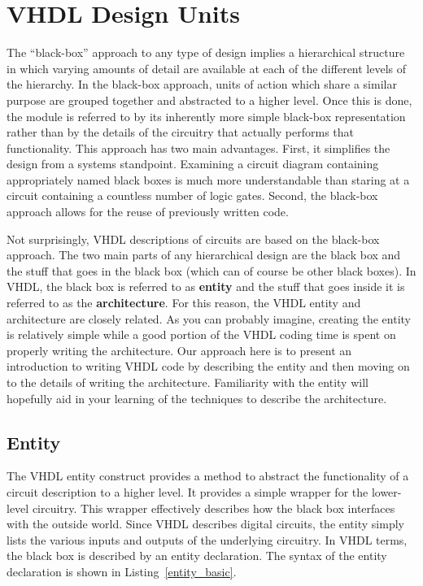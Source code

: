 %
%
\chapter{VHDL Design Units}
The ``black-box'' approach to any type of design implies a hierarchical structure in which varying amounts of detail are available at each of the different levels of the hierarchy. In the black-box approach, units of action which share a similar purpose are grouped together and abstracted to a higher level. Once this is done, the module is referred to by its inherently more simple black-box representation rather than by the details of the circuitry that actually performs that functionality. This approach has two main advantages. First, it simplifies the design from a systems standpoint. Examining a circuit diagram containing appropriately named black boxes is much more understandable than staring at a circuit containing a countless number of logic gates. Second, the black-box approach allows for the reuse of previously written code.

Not surprisingly, VHDL descriptions of circuits are based on the black-box approach. The two main parts of any hierarchical design are the black box and the stuff that goes in the black box (which can of course be other black boxes). In VHDL, the black box is referred to as \textbf{entity} and the stuff that goes inside it is referred to as the \textbf{architecture}. For this reason, the VHDL entity and architecture are closely related. As you can probably imagine, creating the entity is relatively simple while a good portion of the VHDL coding time is spent on properly writing the architecture. Our approach here is to present an introduction to writing VHDL code by describing the entity and then moving on to the details of writing the architecture. Familiarity with the entity will hopefully aid in your learning of the techniques to describe the architecture.

\section{Entity}
The VHDL entity construct provides a method to abstract the functionality of a circuit description to a higher level. It provides a simple wrapper for the lower-level circuitry. This wrapper effectively describes how the black box interfaces with the outside world. Since VHDL describes digital circuits, the entity simply lists the various inputs and outputs of the underlying circuitry. In VHDL terms, the black box is described by an entity declaration. The syntax of the entity declaration is shown in Listing~\ref{entity_basic}.

